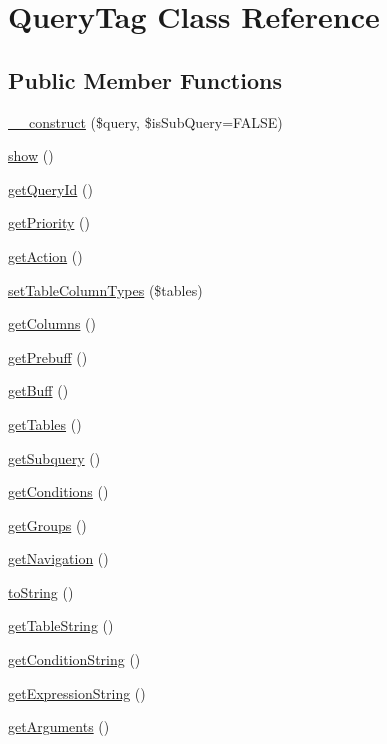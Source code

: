 \hypertarget{classQueryTag}{\section{Query\-Tag Class Reference}
\label{classQueryTag}
}
\subsection*{Public Member Functions}
\begin{DoxyCompactItemize}
\item 
\hyperlink{classQueryTag_a3f0f7315cca9c7199bf37c4f346cc09c}{\-\_\-\-\_\-construct} (\$query, \$is\-Sub\-Query=F\-A\-L\-S\-E)
\item 
\hyperlink{classQueryTag_aa0cbcd28585a3614f51814435ec06846}{show} ()
\item 
\hyperlink{classQueryTag_a449bdb9218e0ea9058720e539a99268e}{get\-Query\-Id} ()
\item 
\hyperlink{classQueryTag_a0c0f1e47dfb8ef88370c400235992d00}{get\-Priority} ()
\item 
\hyperlink{classQueryTag_aee7e1d09d7e7dbb192989c8011160a9c}{get\-Action} ()
\item 
\hyperlink{classQueryTag_a45d5d40a6f6da858bc52695b1a75c657}{set\-Table\-Column\-Types} (\$tables)
\item 
\hyperlink{classQueryTag_a4909be88c35581f69baa42ec67c6a58d}{get\-Columns} ()
\item 
\hyperlink{classQueryTag_ab87ed2df775139a76a47f8d12daff6ba}{get\-Prebuff} ()
\item 
\hyperlink{classQueryTag_a15d995debc8f428419731182b9df6205}{get\-Buff} ()
\item 
\hyperlink{classQueryTag_a016b987e8e488622f64a89b40de7109f}{get\-Tables} ()
\item 
\hyperlink{classQueryTag_a93b8852f75ce2f6df45efe2742eb2b48}{get\-Subquery} ()
\item 
\hyperlink{classQueryTag_a0ee36c6d269e79842fb5e234405b9e3b}{get\-Conditions} ()
\item 
\hyperlink{classQueryTag_a1401e1676925bf78bcbbdb6ed5ad7bf0}{get\-Groups} ()
\item 
\hyperlink{classQueryTag_a5e2bfd8ddd3fc2d64efe6da1af0da8f8}{get\-Navigation} ()
\item 
\hyperlink{classQueryTag_afafda93fa0b7befa5ec3a6805dfa3e0c}{to\-String} ()
\item 
\hyperlink{classQueryTag_a62814037e62c4b29f53f6b9a9d677e17}{get\-Table\-String} ()
\item 
\hyperlink{classQueryTag_a867e1058c082898d0d6e97a04b8901f8}{get\-Condition\-String} ()
\item 
\hyperlink{classQueryTag_a93b4b4a6a4362f1792f72683983ab8d6}{get\-Expression\-String} ()
\item 
\hyperlink{classQueryTag_a96fe5aa277e258437e33b5420ab70eac}{get\-Arguments} ()
\end{DoxyCompactItemize}
